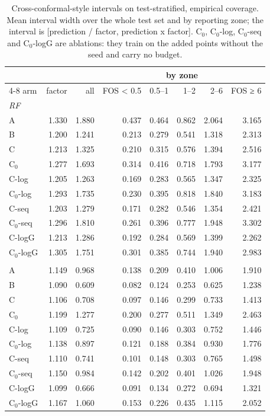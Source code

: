 \begin{table}[htbp]
\centering
\caption{Cross-conformal-style intervals on test-stratified, empirical coverage. Mean interval width over the whole test set and by reporting zone; the interval is [prediction / factor, prediction x factor]. C$_0$, C$_0$-log, C$_0$-seq and C$_0$-logG are ablations: they train on the added points without the seed and carry no budget.}
\label{tab:test-stratified__log-rmse:conformal:width}
\begin{tabular}{lrrrrrrr}
\toprule
 &  &  & \multicolumn{5}{c}{by zone} \\
\cmidrule(lr){4-8}
arm & factor & all & FOS < 0.5 & 0.5–1 & 1–2 & 2–6 & FOS ≥ 6 \\
\midrule
\multicolumn{8}{l}{\textit{RF}} \\
A & 1.330 & 1.880 & 0.437 & 0.464 & 0.862 & 2.064 & 3.165 \\
B & 1.200 & 1.241 & 0.213 & 0.279 & 0.541 & 1.318 & 2.313 \\
C & 1.213 & 1.325 & 0.210 & 0.315 & 0.576 & 1.394 & 2.516 \\
C$_0$ & 1.277 & 1.693 & 0.314 & 0.416 & 0.718 & 1.793 & 3.177 \\
C-log & 1.205 & 1.263 & 0.169 & 0.283 & 0.565 & 1.347 & 2.325 \\
C$_0$-log & 1.293 & 1.735 & 0.230 & 0.395 & 0.818 & 1.840 & 3.183 \\
C-seq & 1.203 & 1.279 & 0.171 & 0.282 & 0.546 & 1.354 & 2.421 \\
C$_0$-seq & 1.296 & 1.810 & 0.261 & 0.396 & 0.777 & 1.948 & 3.302 \\
C-logG & 1.213 & 1.286 & 0.192 & 0.284 & 0.569 & 1.399 & 2.262 \\
C$_0$-logG & 1.305 & 1.751 & 0.301 & 0.385 & 0.744 & 1.940 & 2.983 \\
\addlinespace
\multicolumn{8}{l}{\textit{GBM}} \\
A & 1.149 & 0.968 & 0.138 & 0.209 & 0.410 & 1.006 & 1.910 \\
B & 1.090 & 0.609 & 0.082 & 0.124 & 0.253 & 0.625 & 1.238 \\
C & 1.106 & 0.708 & 0.097 & 0.146 & 0.299 & 0.733 & 1.413 \\
C$_0$ & 1.199 & 1.277 & 0.200 & 0.277 & 0.511 & 1.349 & 2.463 \\
C-log & 1.109 & 0.725 & 0.090 & 0.146 & 0.303 & 0.752 & 1.446 \\
C$_0$-log & 1.138 & 0.897 & 0.121 & 0.188 & 0.384 & 0.930 & 1.776 \\
C-seq & 1.110 & 0.741 & 0.101 & 0.148 & 0.303 & 0.765 & 1.498 \\
C$_0$-seq & 1.150 & 0.984 & 0.142 & 0.202 & 0.401 & 1.026 & 1.948 \\
C-logG & 1.099 & 0.666 & 0.091 & 0.134 & 0.272 & 0.694 & 1.321 \\
C$_0$-logG & 1.167 & 1.060 & 0.153 & 0.226 & 0.435 & 1.115 & 2.052 \\
\bottomrule
\end{tabular}
\end{table}
